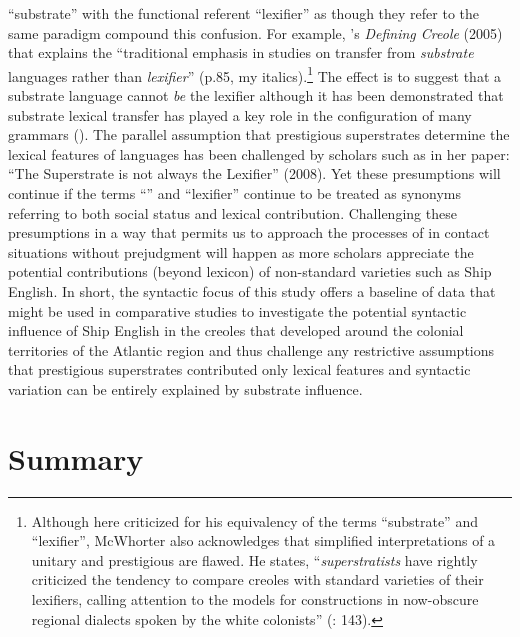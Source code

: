 “substrate” with the functional referent “lexifier” as though they refer to the same paradigm compound this confusion. For example, \citeauthor{McWhorter2005}’s \textit{Defining Creole} (2005) that explains the “traditional emphasis in  studies on transfer from \textit{substrate} languages rather than \textit{lexifier}” (p.85, my italics).\footnote{Although here criticized for his equivalency of the terms “substrate” and “lexifier”, McWhorter also acknowledges that simplified interpretations of a unitary and prestigious  are flawed. He states, “\textit{superstratists} have rightly criticized the tendency to compare creoles with standard varieties of their lexifiers, calling attention to the models for  constructions in now-obscure regional dialects spoken by the white colonists” (\citealt{McWhorter2005}: 143).}  The effect is to suggest that a substrate language cannot \textit{be} the lexifier although it has been demonstrated that substrate lexical transfer has played a key role in the configuration of many  grammars (\citealt{Kihm1989,Migge1998}). The parallel assumption that prestigious superstrates determine the lexical features of  languages has been challenged by scholars such as \citeauthor{Selbach2008} in her paper: “The Superstrate is not always the Lexifier” (2008). Yet these presumptions will continue if the terms “” and “lexifier” continue to be treated as synonyms referring to both social status and lexical contribution. Challenging these presumptions in a way that permits us to approach the processes of  in contact situations without prejudgment will happen as more scholars appreciate the potential contributions (beyond lexicon) of non-standard varieties such as Ship English. In short, the syntactic focus of this study offers a baseline of data that might be used in comparative studies to investigate the potential syntactic influence of Ship English in the creoles that developed around the colonial territories of the Atlantic region and thus challenge any restrictive assumptions that prestigious superstrates contributed only lexical features and syntactic variation can be entirely explained by substrate influence. 

\section{{Summary}}%


